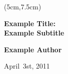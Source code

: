 \documentclass[a4paper]{scrartcl}
\begin{document}

\newcommand{\ThesisType}{Master Thesis} %
\newcommand{\TheTitle}{Example Title}
\newcommand{\TheSubTitle}{Example Subtitle}
\newcommand{\TheAuthor}{Example Author}
\newcommand{\Email}{\url{exampleEmail@cs.uni-kl.de}}
\newcommand{\betreuerA}{Prof. Dr. My Example Prof}
\newcommand{\betreuerB}{Dr. My Example Dr}
\newcommand{\abgabedatum}{April\ 3st, 2011} %
\newcommand{\abgabedatumDE}{1. April 2011} %

\thispagestyle{empty}
\begin{textblock*}{13cm}(5cm,7.5cm)%
	\noindent
	\begin{minipage}[c][7.5cm][c]{13cm}
		\begin{center}
			\LARGE
			\textbf{\TheTitle:\\
			\Large \TheSubTitle}
			
			\large
			
			\vspace{2em}
			\textbf{\TheAuthor}
			
			\vspace{2em}
			\abgabedatum
		\end{center}

	\end{minipage}
\end{textblock*}
\end{document}

